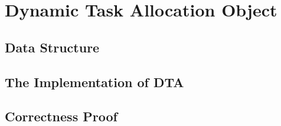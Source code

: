 \chapter{Dynamic Task Allocation Object}



\section*{Data Structure}
\section*{The Implementation of DTA}
\section*{Correctness Proof}

